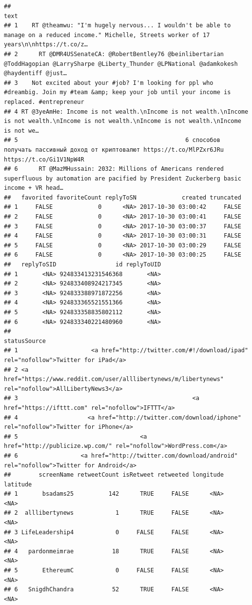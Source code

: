 \documentclass[]{book}
\theoremstyle{definition}
\theoremstyle{definition}
\theoremstyle{remark}
\begin{document}
\begin{verbatim}
##                                                                                                                                                text
## 1    RT @theamwu: "I'm hugely nervous... I wouldn't be able to manage on a reduced income." Michelle, Streets worker of 17 years\n\nhttps://t.co/z…
## 2      RT @DMR4USSenateCA: @RobertBentley76 @beinlibertarian @ToddHagopian @LarrySharpe @Liberty_Thunder @LPNational @adamkokesh @haydentiff @just…
## 3    Not excited about your #job? I'm looking for ppl who #dreambig. Join my #team &amp; keep your job until your income is replaced. #entrepreneur
## 4 RT @3yeAmHe: Income is not wealth.\nIncome is not wealth.\nIncome is not wealth.\nIncome is not wealth.\nIncome is not wealth.\nIncome is not we…
## 5                                                6 способов получать пассивный доход от криптовалют https://t.co/MlPZxr6JRu https://t.co/Gi1V1NpW4R
## 6      RT @MazMHussain: 2032: Millions of Americans rendered superfluous by automation are pacified by President Zuckerberg basic income + VR head…
##   favorited favoriteCount replyToSN             created truncated
## 1     FALSE             0      <NA> 2017-10-30 03:00:42     FALSE
## 2     FALSE             0      <NA> 2017-10-30 03:00:41     FALSE
## 3     FALSE             0      <NA> 2017-10-30 03:00:37     FALSE
## 4     FALSE             0      <NA> 2017-10-30 03:00:31     FALSE
## 5     FALSE             0      <NA> 2017-10-30 03:00:29     FALSE
## 6     FALSE             0      <NA> 2017-10-30 03:00:25     FALSE
##   replyToSID                 id replyToUID
## 1       <NA> 924833413231546368       <NA>
## 2       <NA> 924833408924217345       <NA>
## 3       <NA> 924833388971872256       <NA>
## 4       <NA> 924833365521551366       <NA>
## 5       <NA> 924833358835802112       <NA>
## 6       <NA> 924833340221480960       <NA>
##                                                                                            statusSource
## 1                     <a href="http://twitter.com/#!/download/ipad" rel="nofollow">Twitter for iPad</a>
## 2 <a href="https://www.reddit.com/user/alllibertynews/m/libertynews" rel="nofollow">AllLibertyNews3</a>
## 3                                                  <a href="https://ifttt.com" rel="nofollow">IFTTT</a>
## 4                    <a href="http://twitter.com/download/iphone" rel="nofollow">Twitter for iPhone</a>
## 5                                   <a href="http://publicize.wp.com/" rel="nofollow">WordPress.com</a>
## 6                  <a href="http://twitter.com/download/android" rel="nofollow">Twitter for Android</a>
##        screenName retweetCount isRetweet retweeted longitude latitude
## 1       bsadams25          142      TRUE     FALSE      <NA>     <NA>
## 2  alllibertynews            1      TRUE     FALSE      <NA>     <NA>
## 3 LifeLeadership4            0     FALSE     FALSE      <NA>     <NA>
## 4   pardonmeimrae           18      TRUE     FALSE      <NA>     <NA>
## 5       EthereumC            0     FALSE     FALSE      <NA>     <NA>
## 6   SnigdhChandra           52      TRUE     FALSE      <NA>     <NA>
\end{verbatim}
\end{document}
